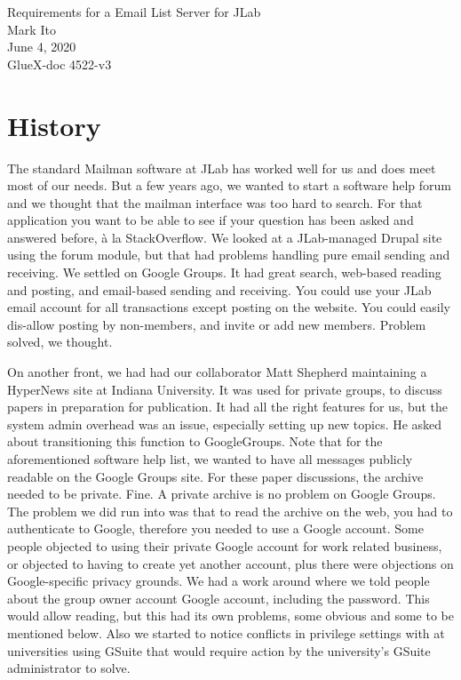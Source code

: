 \documentclass{article}
\begin{document}
\begin{center}
  {\Large Requirements for a Email List Server for JLab} \\
  \medskip
  {\large Mark Ito \\
    June 4, 2020} \\
  GlueX-doc 4522-v3
\end{center}

\section{History}

The standard Mailman software at JLab has worked well for us and does
meet most of our needs. But a few years ago, we wanted to start a
software help forum and we thought that the mailman interface was too
hard to search. For that application you want to be able to see if
your question has been asked and answered before, \` a la StackOverflow. We looked at a
JLab-managed Drupal site using the forum module, but that had problems
handling pure email sending and receiving. We settled on Google
Groups. It had great search, web-based reading and posting, and
email-based sending and receiving. You could use your JLab email
account for all transactions except posting on the website. You could
easily dis-allow posting by non-members, and invite or add new
members. Problem solved, we thought.

On another front, we had had our collaborator Matt Shepherd
maintaining a HyperNews site at Indiana University. It was used for
private groups, to discuss papers in preparation for publication. It
had all the right features for us, but the system admin overhead was
an issue, especially setting up new topics. He asked about
transitioning this function to GoogleGroups. Note that for the
aforementioned software help list, we wanted to have all messages
publicly readable on the Google Groups site. For these paper discussions,
the archive needed to be private. Fine. A private archive is no
problem on Google Groups. The problem we did run into was that to read
the archive on
the web, you had to authenticate to Google, therefore you needed to use a
Google account. Some people objected to using their private Google
account for work related business, or objected to having to create yet
another account, plus there were objections on
Google-specific privacy grounds.
We had a work around where we told people about the
group owner account Google account, including the
password. This would allow reading, but this had its own problems,
some obvious and some to be mentioned below. Also we started to notice
conflicts in privilege settings with at universities using GSuite that
would require action by the university's GSuite administrator to
solve.
\end{document}
